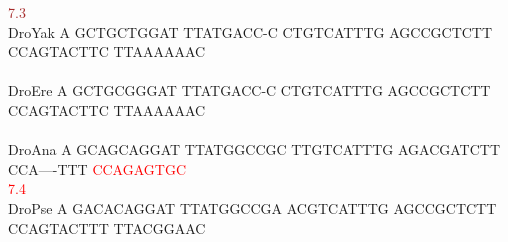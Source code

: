 \documentclass[11pt,twoside,reqno,a4paper]{article}
\begin{document}
{\hspace*{7\charwidth}\hspace*{0\charwidth}\textcolor{Brown}{7.3}\hspace*{1\charwidth}\hspace*{1\charwidth}\hspace*{1\charwidth}\hspace*{1\charwidth}\hspace*{1\charwidth}\hspace*{1\charwidth}\\
DroYak	A	GCTGCTGGAT	TTATGACC-C	CTGTCATTTG	AGCCGCTCTT	CCAGTACTTC	TTAAAAAAC\\
\hspace*{7\charwidth}\hspace*{1\charwidth}\hspace*{1\charwidth}\hspace*{1\charwidth}\hspace*{1\charwidth}\hspace*{1\charwidth}\hspace*{1\charwidth}\\
DroEre	A	GCTGCGGGAT	TTATGACC-C	CTGTCATTTG	AGCCGCTCTT	CCAGTACTTC	TTAAAAAAC\\
\hspace*{7\charwidth}\hspace*{1\charwidth}\hspace*{1\charwidth}\hspace*{1\charwidth}\hspace*{1\charwidth}\hspace*{1\charwidth}\hspace*{1\charwidth}\\
DroAna	A	GCAGCAGGAT	TTATGGCCGC	TTGTCATTTG	AGACGATCTT	CCA----TTT	\textcolor{Red}{C}\textcolor{Red}{C}\textcolor{Red}{A}\textcolor{Red}{G}\textcolor{Red}{A}\textcolor{Red}{G}\textcolor{Red}{T}\textcolor{Red}{G}\textcolor{Red}{C}\\
\hspace*{7\charwidth}\hspace*{1\charwidth}\hspace*{1\charwidth}\hspace*{1\charwidth}\hspace*{1\charwidth}\hspace*{1\charwidth}\hspace*{1\charwidth}\hspace*{51\charwidth}\textcolor{Red}{7.4}\\
DroPse	A	GACACAGGAT	TTATGGCCGA	ACGTCATTTG	AGCCGCTCTT	CCAGTACTTT	TTACGGAAC\\
}
\end{document}
